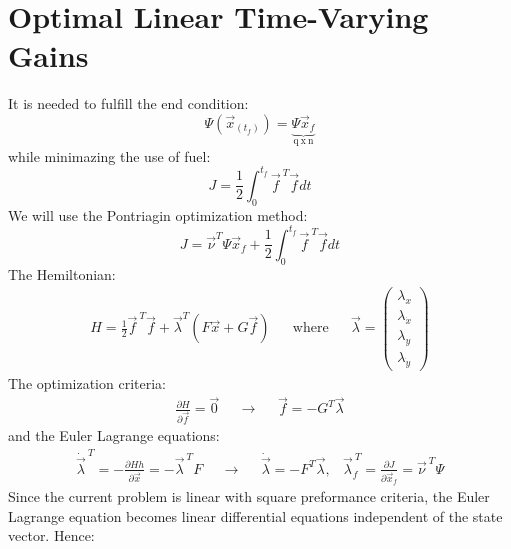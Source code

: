 \documentclass[11pt, a4paper]{article}
\begin{document}
\section{Optimal Linear Time-Varying Gains}
It is needed to fulfill the end condition:
\begin{equation}
    \Psi\left(\vec{x}_{\left(t_f\right)}\right)=\underbrace{\Psi\vec{x}_f}_{\mathrm{q\ x\ n}}
\end{equation}
while minimazing the use of fuel:
\begin{equation}
    J=\frac{1}{2}\int_0^{t_f}\vec{f}^{\ T}\vec{f}dt
\end{equation}
We will use the Pontriagin optimization method:
\begin{equation}
    J=\vec{\nu}^T\Psi\vec{x}_f+\frac{1}{2}\int_0^{t_f}\vec{f}^{\ T}\vec{f}dt
\end{equation}
The Hemiltonian:
\begin{equation}
    \begin{matrix}
        \displaystyle H=\frac{1}{2}\vec{f}^{\ T}\vec{f}+\vec{\lambda}^T\left(F\vec{x}+G\vec{f}\right) && \mathrm{where} && \vec{\lambda}=\begin{pmatrix}
            \lambda_x\\\lambda_{\dot{x}}\\\lambda_y\\\lambda_{\dot{y}}
        \end{pmatrix}
    \end{matrix}
\end{equation}
The optimization criteria:
\begin{equation}
    \begin{matrix}
        \displaystyle\frac{\partial H}{\partial\vec{f}}=\vec{0} && \rightarrow && \vec{f}=-G^T\vec{\lambda}
    \end{matrix}
\end{equation}
and the Euler Lagrange equations:
\begin{equation}
    \begin{matrix}
        \displaystyle\dot{\vec{\lambda}}^{\ T}=-\frac{\partial Hh}{\partial\vec{x}}=-\vec{\lambda}^{\ T}F && \rightarrow && \dot{\vec{\lambda}}=-F^T\vec{\lambda}, &\displaystyle \vec{\lambda}_f^{\ T}=\frac{\partial J}{\partial\vec{x}_f}=\vec{\nu}^{\ T}\Psi
    \end{matrix}
\end{equation}
Since the current problem is linear with square preformance criteria, the Euler Lagrange equation becomes linear differential equations independent of the state vector. Hence:
\end{document}
